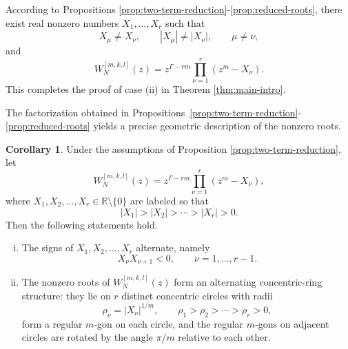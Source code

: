 \documentclass[preprint,3p,10pt]{elsarticle}
\theoremstyle{definition}
\newtheorem{corollary}[definition]{Corollary}
\begin{document}
According to Propositions
\ref{prop:two-term-reduction}-\ref{prop:reduced-roots}, there exist real nonzero numbers \(X_1,\ldots,X_r\) such that
\begin{equation}\label{eq:Nge3-X-properties}
    X_\mu\ne X_\nu,\qquad |X_\mu|\ne |X_\nu|,
    \qquad \mu\ne\nu,
\end{equation}
and
\begin{equation}\label{eq:Nge3-factorization}
    W_N^{[m,k,l]}(z)
    =
    z^{\Gamma-rm}\prod_{\nu=1}^{r}(z^m-X_\nu).
\end{equation}
This completes the proof of case (ii) in Theorem \ref{thm:main-intro}.

The factorization obtained in Propositions~\ref{prop:two-term-reduction}-\ref{prop:reduced-roots} yields a precise geometric description of the nonzero roots.
\begin{corollary}
\label{cor:alternating-ring-structure}
Under the assumptions of Proposition \ref{prop:two-term-reduction}, let 
\begin{equation}
\label{eq:alternating-ring-factorization}
    W_N^{[m,k,l]}(z)
    =
    z^{\Gamma-rm}
    \prod_{\nu=1}^{r}(z^m-X_\nu),
\end{equation}
where \(X_1,X_2,\ldots,X_r\in\mathbb R\setminus\{0\}\) are labeled so that
\begin{equation}
    |X_1|>|X_2|>\cdots>|X_r|>0.
\end{equation}
Then the following statements hold.

\begin{enumerate}[(i)]
\item The signs of \(X_1,X_2,\ldots,X_r\) alternate, namely
\begin{equation}
    X_\nu X_{\nu+1}<0,
    \qquad
    \nu=1,\ldots,r-1.
\end{equation}

\item The nonzero roots of \(W_N^{[m,k,l]}(z)\) form an alternating
concentric-ring structure: they lie on \(r\) distinct concentric circles
with radii
\begin{equation}
    \rho_\nu=|X_\nu|^{1/m},
    \qquad
    \rho_1>\rho_2>\cdots>\rho_r>0,
\end{equation}
form a regular \(m\)-gon on each circle, and the regular \(m\)-gons on
adjacent circles are rotated by the angle \(\pi/m\) relative to each other.
\end{enumerate}
\end{corollary}
\end{document}
